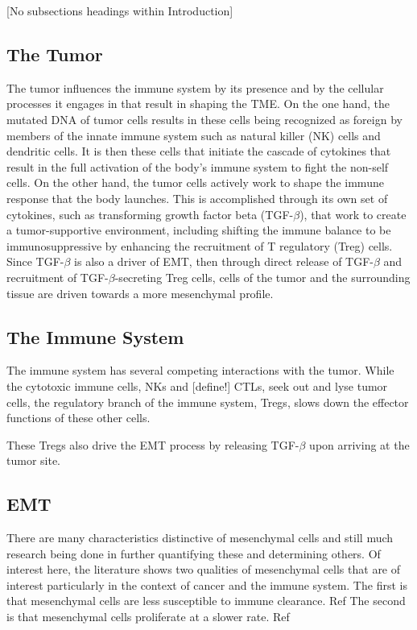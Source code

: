 \documentclass{article}
\begin{document}
[No subsections headings within Introduction]
\subsection{The Tumor}\label{TheTumor}
The tumor influences the immune system by its presence and by the cellular processes it engages in that result in shaping the TME.
On the one hand, the mutated DNA of tumor cells results in these cells being recognized as foreign by members of the innate immune system such as natural killer (NK) cells and dendritic cells.
It is then these cells that initiate the cascade of cytokines that result in the full activation of the body's immune system to fight the non-self cells.
On the other hand, the tumor cells actively work to shape the immune response that the body launches.
This is accomplished through its own set of cytokines, such as transforming growth factor beta (TGF-$\beta$), that work to create a tumor-supportive environment, including shifting the immune balance to be immunosuppressive by enhancing the recruitment of T regulatory (Treg) cells. Since TGF-$\beta$ is also a driver of EMT, then through direct release of TGF-$\beta$ and recruitment of TGF-$\beta$-secreting Treg cells, cells of the tumor and the surrounding tissue are driven towards a more mesenchymal profile. 


\subsection{The Immune System}\label{TheImmuneSystem}
The immune system has several competing interactions with the tumor.
While the cytotoxic immune cells, NKs and [define!] CTLs, seek out and lyse tumor cells, the regulatory branch of the immune system, Tregs, slows down the effector functions of these other cells.

These Tregs also drive the EMT process by releasing TGF-$\beta$ upon arriving at the tumor site.

\subsection{EMT}\label{EMT}
There are many characteristics distinctive of mesenchymal cells and still much research being done in further quantifying these and determining others.
Of interest here, the literature shows two qualities of mesenchymal cells that are of interest particularly in the context of cancer and the immune system.
The first is that mesenchymal cells are less susceptible to immune clearance. Ref 
The second is that mesenchymal cells proliferate at a slower rate. Ref 
\end{document}
